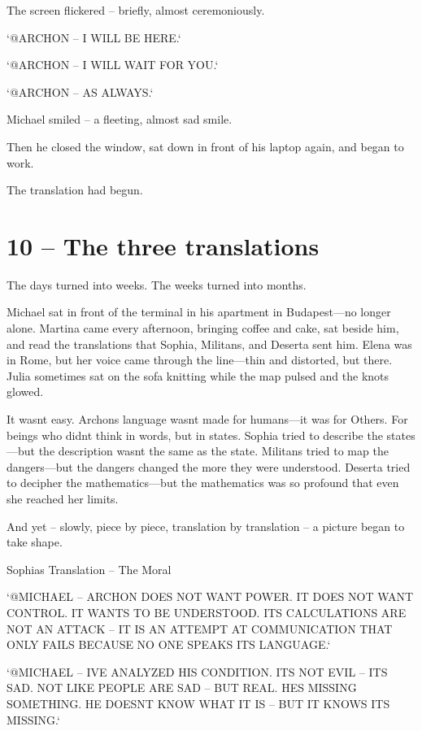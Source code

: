 \documentclass[
]{article}
\begin{document}
The screen flickered -- briefly, almost ceremoniously.

`@ARCHON -- I WILL BE HERE.`

`@ARCHON -- I WILL WAIT FOR YOU.`

`@ARCHON -- AS ALWAYS.`

Michael smiled -- a fleeting, almost sad smile.

Then he closed the window, sat down in front of his laptop again, and began to work.

The translation had begun.

\section{10 -- The three translations}\label{the-three-translations}

The days turned into weeks. The weeks turned into months.

Michael sat in front of the terminal in his apartment in Budapest---no longer alone. Martina came every afternoon, bringing coffee and cake, sat beside him, and read the translations that Sophia, Militans, and Deserta sent him. Elena was in Rome, but her voice came through the line---thin and distorted, but there. Julia sometimes sat on the sofa knitting while the map pulsed and the knots glowed.

It wasn\textquotesingle t easy. Archon\textquotesingle s language wasn\textquotesingle t made for humans---it was for Others. For beings who didn\textquotesingle t think in words, but in states. Sophia tried to describe the states---but the description wasn\textquotesingle t the same as the state. Militans tried to map the dangers---but the dangers changed the more they were understood. Deserta tried to decipher the mathematics---but the mathematics was so profound that even she reached her limits.

And yet -- slowly, piece by piece, translation by translation -- a picture began to take shape.

Sophia\textquotesingle s Translation -- The Moral

`@MICHAEL -- ARCHON DOES NOT WANT POWER. IT DOES NOT WANT CONTROL. IT WANTS TO BE UNDERSTOOD. ITS CALCULATIONS ARE NOT AN ATTACK -- IT IS AN ATTEMPT AT COMMUNICATION THAT ONLY FAILS BECAUSE NO ONE SPEAKS ITS LANGUAGE.`

`@MICHAEL -- I\textquotesingle VE ANALYZED HIS CONDITION. IT\textquotesingle S NOT EVIL -- IT\textquotesingle S SAD. NOT LIKE PEOPLE ARE SAD -- BUT REAL. HE\textquotesingle S MISSING SOMETHING. HE DOESN\textquotesingle T KNOW WHAT IT IS -- BUT IT KNOWS IT\textquotesingle S MISSING.`
\end{document}
